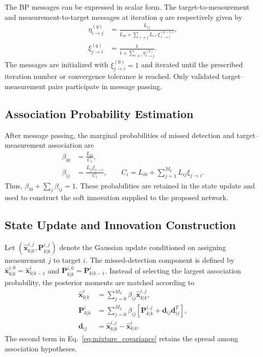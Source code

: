 \documentclass[10pt,doublecolumn]{IEEEtaes}
\begin{document}
The BP messages can be expressed in scalar form. The target-to-measurement and measurement-to-target messages at iteration $q$ are respectively given by \cite{williams2010convergence,meyer2018message}
\begin{align}
\eta_{i\rightarrow j}^{(q)}&=
\frac{L_{ij}}{L_{i0}+\sum_{\ell\neq j}L_{i\ell}\xi_{\ell\rightarrow i}^{(q-1)}},
\label{eq:bp_eta}\\
\xi_{j\rightarrow i}^{(q)}&=
\frac{1}{1+\sum_{r\neq i}\eta_{r\rightarrow j}^{(q)}}.
\label{eq:bp_xi}
\end{align}
The messages are initialized with $\xi_{j\rightarrow i}^{(0)}=1$ and iterated until the prescribed iteration number or convergence tolerance is reached. Only validated target--measurement pairs participate in message passing.

\subsection{Association Probability Estimation}

After message passing, the marginal probabilities of missed detection and target--measurement association are
\begin{align}
\beta_{i0}&=\frac{L_{i0}}{C_i},\\
\beta_{ij}&=\frac{L_{ij}\xi_{j\rightarrow i}}{C_i},\qquad
C_i=L_{i0}+\sum_{j=1}^{M_k}L_{ij}\xi_{j\rightarrow i}.
\label{eq:association_probability}
\end{align}
Thus, $\beta_{i0}+\sum_j\beta_{ij}=1$. These probabilities are retained in the state update and used to construct the soft innovation supplied to the proposed network.

\subsection{State Update and Innovation Construction}

Let $(\hat{\mathbf{x}}_{k|k}^{i,j},\mathbf{P}_{k|k}^{i,j})$ denote the Gaussian update conditioned on assigning measurement $j$ to target $i$. The missed-detection component is defined by $\hat{\mathbf{x}}_{k|k}^{i,0}=\hat{\mathbf{x}}_{k|k-1}^{i}$ and $\mathbf{P}_{k|k}^{i,0}=\mathbf{P}_{k|k-1}^{i}$. Instead of selecting the largest association probability, the posterior moments are matched according to
\begin{align}
\hat{\mathbf{x}}_{k|k}^{i}&=\sum_{j=0}^{M_k}\beta_{ij}\hat{\mathbf{x}}_{k|k}^{i,j},
\label{eq:mixture_mean}\\
\mathbf{P}_{k|k}^{i}&=\sum_{j=0}^{M_k}\beta_{ij}
\left[\mathbf{P}_{k|k}^{i,j}+\mathbf{d}_{ij}\mathbf{d}_{ij}^{T}\right],
\label{eq:mixture_covariance}\\
\mathbf{d}_{ij}&=\hat{\mathbf{x}}_{k|k}^{i,j}-\hat{\mathbf{x}}_{k|k}^{i}.
\end{align}
The second term in Eq.~\eqref{eq:mixture_covariance} retains the spread among association hypotheses.
\end{document}
